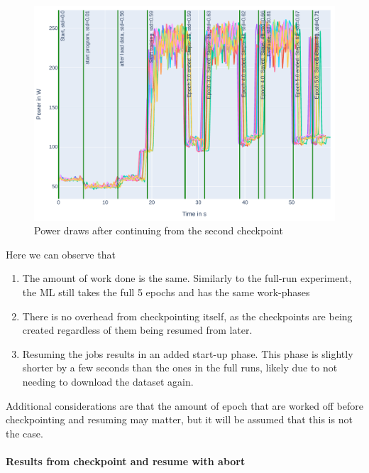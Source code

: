 \begin{figure}
    \includegraphics[width=\linewidth]{power-measurements/stacked_plots/roberta_continue_after_saving.pdf}
    \caption{Power draws after continuing from the second checkpoint}
    \label{fig:plot_partial_saved_continue_stacked}
\end{figure}

Here we can observe that

\begin{enumerate}
    \item The amount of work done is the same. 
    Similarly to the full-run experiment, the ML still takes the full 5 epochs and has the same work-phases
    \item There is no overhead from checkpointing itself, as the checkpoints are being created regardless of them being resumed from later.
    \item Resuming the jobs results in an added start-up phase. This phase is slightly shorter by a few seconds than the ones in the full runs, likely due to not needing to download the dataset again.
\end{enumerate}

Additional considerations are that the amount of epoch that are worked off before checkpointing and resuming may matter, but it will be assumed that this is not the case.

\paragraph{Results from checkpoint and resume with abort}

